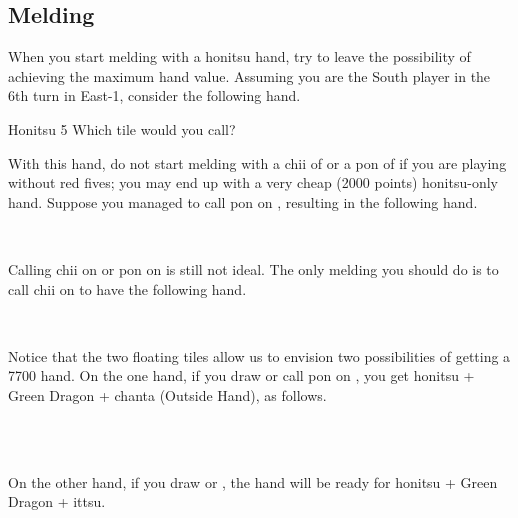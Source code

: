 \bigskip
\subsection{Melding}
When you start melding with a {\jap honitsu} hand, try to leave the possibility of achieving the maximum hand value. Assuming you are the South player in the 6th turn in East-1, consider the following hand.

\bigskip
\begin{itembox}[r]{{\jap Honitsu} 5}
\bp
{}\xi\bei\bei\fa\fa
\ep
\vspace{-10pt}Which tile would you call? \vspace{-5pt}
\end{itembox}

\bigskip
With this hand, do not start melding with a {\jap chii} of {\LARGE{}} or a {\jap pon} of {\LARGE\bei} if you are playing without red fives; you may end up with a very cheap (2000 points) {\jap honitsu}-only hand. 
Suppose you managed to call {\jap pon} on {\LARGE\fa}, resulting in the following hand. 

\bp
{}\xi\bei\bei~\fa\rfa\fa
\ep

\bigskip
Calling {\jap chii} on {\LARGE{}} or {\jap pon} on {\LARGE\bei} is still not ideal. The only melding you should do is to call {\jap chii} on {\LARGE{}} to have the following hand.

\bp
{}\xi\bei\bei~~\fa\rfa\fa
\ep

\bigskip
Notice that the two floating tiles {\LARGE{} \xi} allow us to envision two possibilities of getting a 7700 hand. 
On the one hand, if you draw {\LARGE\xi} or call {\jap pon} on {\LARGE\bei}, you get {\jap honitsu} + Green Dragon + {\jap chanta} (Outside Hand), as follows.

\bp
{}\xi\xi\bei\bei~~\fa\rfa\fa\\
\xi~\bei\bei\rbei~~\fa\rfa\fa
\ep

\bigskip
On the other hand, if you draw {\LARGE{}} or {\LARGE{}}, the hand will be ready for {\jap honitsu} + Green Dragon + {\jap ittsu}. 

\bp
{}\bei\bei~~\fa\rfa\fa\\
\bei\bei~~\fa\rfa\fa
\ep

